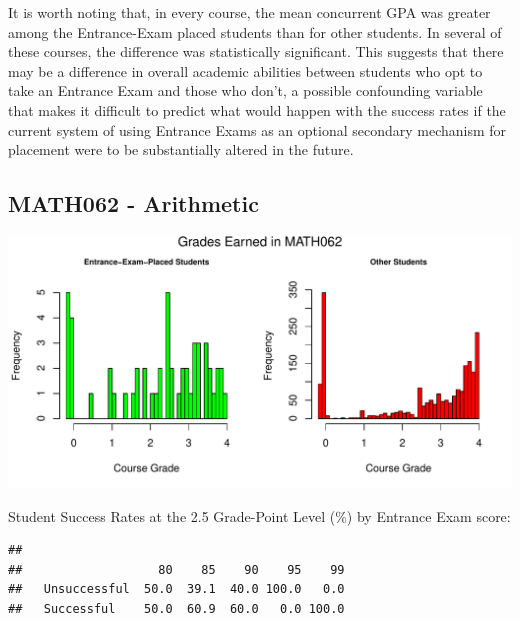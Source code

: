 \documentclass[twoside]{article}\usepackage[]{graphicx}\usepackage[]{color}
\makeatletter
\def\maxwidth{ %
  \ifdim\Gin@nat@width>\linewidth
    \linewidth
  \else
    \Gin@nat@width
  \fi
}
\newenvironment{kframe}{%
 \def\at@end@of@kframe{}%
 \ifinner\ifhmode%
  \def\at@end@of@kframe{\end{minipage}}%
  \begin{minipage}{\columnwidth}%
 \fi\fi%
 \def\FrameCommand##1{\hskip\@totalleftmargin \hskip-\fboxsep
 \colorbox{shadecolor}{##1}\hskip-\fboxsep
     \hskip-\linewidth \hskip-\@totalleftmargin \hskip\columnwidth}%
 \MakeFramed {\advance\hsize-\width
   \@totalleftmargin\z@ \linewidth\hsize
   \@setminipage}}%
 {\par\unskip\endMakeFramed%
 \at@end@of@kframe}
\newenvironment{knitrout}{}{} %
\makeatother
\begin{document}
It is worth noting that, in every course, the mean concurrent GPA was greater among the Entrance-Exam placed students than for other students.  In several of these courses, the difference was statistically significant.  This suggests that there may be a difference in overall academic abilities between students who opt to take an Entrance Exam and those who don't, a possible confounding variable that makes it difficult to predict what would happen with the success rates if the current system of using Entrance Exams as an optional secondary mechanism for placement were to be substantially altered in the future.













\newpage
\subsection{MATH062 - Arithmetic}

\begin{knitrout}
\color{fgcolor}
\includegraphics[width=\maxwidth]{figure/graphs062-1} 

\end{knitrout}

Student Success Rates at the 2.5 Grade-Point Level (\%) by Entrance Exam score:

\begin{knitrout}
\color{fgcolor}\begin{kframe}
\begin{verbatim}
##               
##                   80    85    90    95    99
##   Unsuccessful  50.0  39.1  40.0 100.0   0.0
##   Successful    50.0  60.9  60.0   0.0 100.0
\end{verbatim}
\end{kframe}
\end{knitrout}
\end{document}
